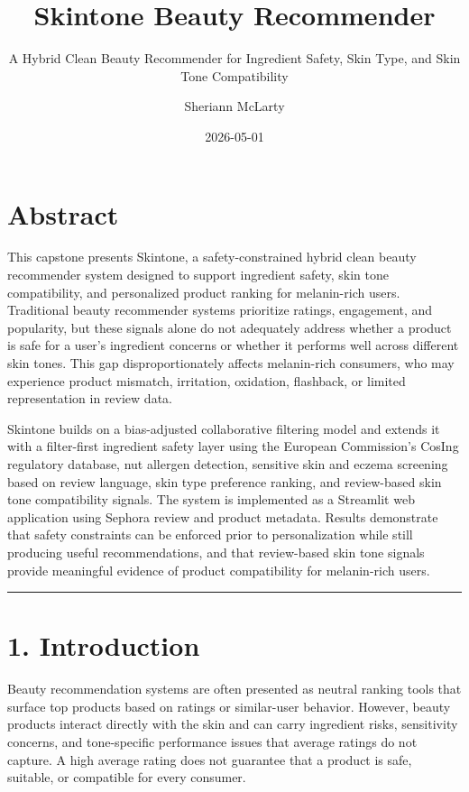 \documentclass[
  letterpaper,
  DIV=11,
  numbers=noendperiod]{scrartcl}
\title{Skintone Beauty Recommender}
\subtitle{A Hybrid Clean Beauty Recommender for Ingredient Safety, Skin
Type, and Skin Tone Compatibility}
\author{Sheriann McLarty}
\date{2026-05-01}
\renewcommand*\contentsname{Table of contents}
\newcommand\contentsname{Table of contents}
\begin{document}
\maketitle

\renewcommand*\contentsname{Table of contents}
{
\setcounter{tocdepth}{3}
\tableofcontents
}

\section{Abstract}\label{abstract}

This capstone presents Skintone, a safety-constrained hybrid clean
beauty recommender system designed to support ingredient safety, skin
tone compatibility, and personalized product ranking for melanin-rich
users. Traditional beauty recommender systems prioritize ratings,
engagement, and popularity, but these signals alone do not adequately
address whether a product is safe for a user's ingredient concerns or
whether it performs well across different skin tones. This gap
disproportionately affects melanin-rich consumers, who may experience
product mismatch, irritation, oxidation, flashback, or limited
representation in review data.

Skintone builds on a bias-adjusted collaborative filtering model and
extends it with a filter-first ingredient safety layer using the
European Commission's CosIng regulatory database, nut allergen
detection, sensitive skin and eczema screening based on review language,
skin type preference ranking, and review-based skin tone compatibility
signals. The system is implemented as a Streamlit web application using
Sephora review and product metadata. Results demonstrate that safety
constraints can be enforced prior to personalization while still
producing useful recommendations, and that review-based skin tone
signals provide meaningful evidence of product compatibility for
melanin-rich users.

\begin{center}\rule{0.5\linewidth}{0.5pt}\end{center}

\section{1. Introduction}\label{introduction}

Beauty recommendation systems are often presented as neutral ranking
tools that surface top products based on ratings or similar-user
behavior. However, beauty products interact directly with the skin and
can carry ingredient risks, sensitivity concerns, and tone-specific
performance issues that average ratings do not capture. A high average
rating does not guarantee that a product is safe, suitable, or
compatible for every consumer.
\end{document}
